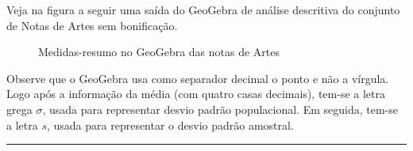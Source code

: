 Veja na figura a seguir uma saída do GeoGebra de análise descritiva do conjunto de Notas de Artes sem bonificação.

\begin{figure}[H]
\centering
\capstart

\noindent{}
\caption{Medidas-resumo no GeoGebra das notas de Artes}\label{\detokenize{PE104-4:fig-medidas-resumo-geogebra}}\label{\detokenize{PE104-4:id8}}\end{figure}

Observe que o GeoGebra usa como separador decimal o ponto e não a vírgula. Logo após a informação da média (com quatro casas decimais), tem-se a letra grega \(\sigma\), usada para representar desvio padrão populacional. Em seguida, tem-se a letra \(s\), usada para representar o desvio padrão amostral.
\label{\detokenize{PE104-4:ativ-inflacao-anual}}

\bigskip\hrule\bigskip


